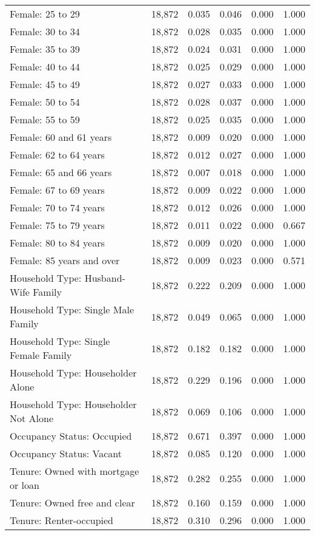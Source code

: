 \begin{longtable}{@{\extracolsep{5pt}}lccccc}
Female: 25 to 29 & 18,872 & 0.035 & 0.046 & 0.000 & 1.000 \\ 
Female: 30 to 34 & 18,872 & 0.028 & 0.035 & 0.000 & 1.000 \\ 
Female: 35 to 39 & 18,872 & 0.024 & 0.031 & 0.000 & 1.000 \\ 
Female: 40 to 44 & 18,872 & 0.025 & 0.029 & 0.000 & 1.000 \\ 
Female: 45 to 49 & 18,872 & 0.027 & 0.033 & 0.000 & 1.000 \\ 
Female: 50 to 54 & 18,872 & 0.028 & 0.037 & 0.000 & 1.000 \\ 
Female: 55 to 59 & 18,872 & 0.025 & 0.035 & 0.000 & 1.000 \\ 
Female: 60 and 61 years & 18,872 & 0.009 & 0.020 & 0.000 & 1.000 \\ 
Female: 62 to 64 years & 18,872 & 0.012 & 0.027 & 0.000 & 1.000 \\ 
Female: 65 and 66 years & 18,872 & 0.007 & 0.018 & 0.000 & 1.000 \\ 
Female: 67 to 69 years & 18,872 & 0.009 & 0.022 & 0.000 & 1.000 \\ 
Female: 70 to 74 years & 18,872 & 0.012 & 0.026 & 0.000 & 1.000 \\ 
Female: 75 to 79 years & 18,872 & 0.011 & 0.022 & 0.000 & 0.667 \\ 
Female: 80 to 84 years & 18,872 & 0.009 & 0.020 & 0.000 & 1.000 \\ 
Female: 85 years and over & 18,872 & 0.009 & 0.023 & 0.000 & 0.571 \\ 
Household Type: Husband-Wife Family & 18,872 & 0.222 & 0.209 & 0.000 & 1.000 \\ 
Household Type: Single Male Family & 18,872 & 0.049 & 0.065 & 0.000 & 1.000 \\ 
Household Type: Single Female Family & 18,872 & 0.182 & 0.182 & 0.000 & 1.000 \\ 
Household Type: Householder Alone & 18,872 & 0.229 & 0.196 & 0.000 & 1.000 \\ 
Household Type: Householder Not Alone & 18,872 & 0.069 & 0.106 & 0.000 & 1.000 \\ 
Occupancy Status: Occupied & 18,872 & 0.671 & 0.397 & 0.000 & 1.000 \\ 
Occupancy Status: Vacant & 18,872 & 0.085 & 0.120 & 0.000 & 1.000 \\ 
Tenure: Owned with mortgage or loan & 18,872 & 0.282 & 0.255 & 0.000 & 1.000 \\ 
Tenure: Owned free and clear & 18,872 & 0.160 & 0.159 & 0.000 & 1.000 \\ 
Tenure: Renter-occupied & 18,872 & 0.310 & 0.296 & 0.000 & 1.000 \\ 
\end{longtable} 
\endgroup 
